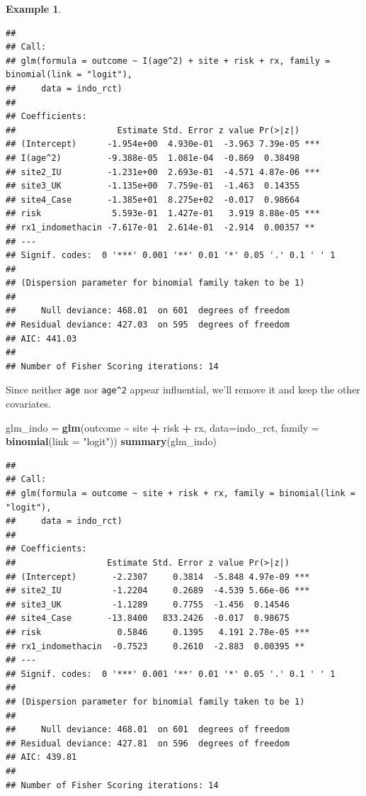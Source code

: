 \documentclass[
  openany]{book}
\newenvironment{Shaded}{\begin{snugshade}}{\end{snugshade}}
\newcommand{\AttributeTok}[1]{\textcolor[rgb]{0.13,0.29,0.53}{#1}}
\newcommand{\FunctionTok}[1]{\textcolor[rgb]{0.13,0.29,0.53}{\textbf{#1}}}
\newcommand{\NormalTok}[1]{#1}
\newcommand{\OtherTok}[1]{\textcolor[rgb]{0.56,0.35,0.01}{#1}}
\newcommand{\SpecialCharTok}[1]{\textcolor[rgb]{0.81,0.36,0.00}{\textbf{#1}}}
\newcommand{\StringTok}[1]{\textcolor[rgb]{0.31,0.60,0.02}{#1}}
\theoremstyle{definition}
\theoremstyle{definition}
\newtheorem{example}{Example}[chapter]
\theoremstyle{definition}
\theoremstyle{definition}
\theoremstyle{remark}
\begin{document}
\begin{example}
\begin{verbatim}
## 
## Call:
## glm(formula = outcome ~ I(age^2) + site + risk + rx, family = binomial(link = "logit"), 
##     data = indo_rct)
## 
## Coefficients:
##                    Estimate Std. Error z value Pr(>|z|)    
## (Intercept)      -1.954e+00  4.930e-01  -3.963 7.39e-05 ***
## I(age^2)         -9.388e-05  1.081e-04  -0.869  0.38498    
## site2_IU         -1.231e+00  2.693e-01  -4.571 4.87e-06 ***
## site3_UK         -1.135e+00  7.759e-01  -1.463  0.14355    
## site4_Case       -1.385e+01  8.275e+02  -0.017  0.98664    
## risk              5.593e-01  1.427e-01   3.919 8.88e-05 ***
## rx1_indomethacin -7.617e-01  2.614e-01  -2.914  0.00357 ** 
## ---
## Signif. codes:  0 '***' 0.001 '**' 0.01 '*' 0.05 '.' 0.1 ' ' 1
## 
## (Dispersion parameter for binomial family taken to be 1)
## 
##     Null deviance: 468.01  on 601  degrees of freedom
## Residual deviance: 427.03  on 595  degrees of freedom
## AIC: 441.03
## 
## Number of Fisher Scoring iterations: 14
\end{verbatim}

Since neither \texttt{age} nor \texttt{age\^{}2} appear influential, we'll remove it and keep the other covariates.

\begin{Shaded}
\begin{Highlighting}[]
\NormalTok{glm\_indo }\OtherTok{=} \FunctionTok{glm}\NormalTok{(outcome }\SpecialCharTok{\textasciitilde{}}\NormalTok{ site }\SpecialCharTok{+}\NormalTok{ risk }\SpecialCharTok{+}\NormalTok{ rx, }\AttributeTok{data=}\NormalTok{indo\_rct, }\AttributeTok{family =} \FunctionTok{binomial}\NormalTok{(}\AttributeTok{link =} \StringTok{"logit"}\NormalTok{))}
\FunctionTok{summary}\NormalTok{(glm\_indo)}
\end{Highlighting}
\end{Shaded}

\begin{verbatim}
## 
## Call:
## glm(formula = outcome ~ site + risk + rx, family = binomial(link = "logit"), 
##     data = indo_rct)
## 
## Coefficients:
##                  Estimate Std. Error z value Pr(>|z|)    
## (Intercept)       -2.2307     0.3814  -5.848 4.97e-09 ***
## site2_IU          -1.2204     0.2689  -4.539 5.66e-06 ***
## site3_UK          -1.1289     0.7755  -1.456  0.14546    
## site4_Case       -13.8400   833.2426  -0.017  0.98675    
## risk               0.5846     0.1395   4.191 2.78e-05 ***
## rx1_indomethacin  -0.7523     0.2610  -2.883  0.00395 ** 
## ---
## Signif. codes:  0 '***' 0.001 '**' 0.01 '*' 0.05 '.' 0.1 ' ' 1
## 
## (Dispersion parameter for binomial family taken to be 1)
## 
##     Null deviance: 468.01  on 601  degrees of freedom
## Residual deviance: 427.81  on 596  degrees of freedom
## AIC: 439.81
## 
## Number of Fisher Scoring iterations: 14
\end{verbatim}


\end{example}
\end{document}
